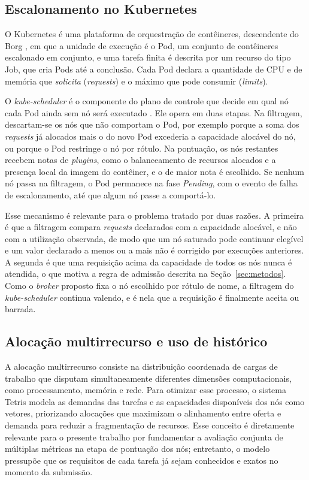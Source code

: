 \documentclass[11pt,a4paper]{article}
\begin{document}
\subsection{Escalonamento no Kubernetes}

O Kubernetes é uma plataforma de orquestração de contêineres, descendente do
Borg \cite{verma2015borg}, em que a unidade de execução é o Pod, um conjunto de
contêineres escalonado em conjunto, e uma tarefa finita é descrita por um
recurso do tipo Job, que cria Pods até a conclusão. Cada Pod declara a
quantidade de CPU e de memória que \textit{solicita} (\textit{requests}) e o
máximo que pode consumir (\textit{limits}).

O \textit{kube-scheduler} é o componente do plano de controle que decide em
qual nó cada Pod ainda sem nó será executado \cite{k8s2026scheduler}. Ele
opera em duas etapas. Na filtragem, descartam-se os nós que não comportam o
Pod, por exemplo porque a soma dos \textit{requests} já alocados mais o do novo
Pod excederia a capacidade alocável do nó, ou porque o Pod restringe o nó por
rótulo. Na pontuação, os nós restantes recebem notas de \textit{plugins}, como
o balanceamento de recursos alocados e a presença local da imagem do
contêiner, e o de maior nota é escolhido. Se nenhum nó passa na filtragem, o
Pod permanece na fase \textit{Pending}, com o evento de falha de
escalonamento, até que algum nó passe a comportá-lo.

Esse mecanismo é relevante para o problema tratado por duas razões. A
primeira é que a filtragem compara \textit{requests} declarados com a
capacidade alocável, e não com a utilização observada, de modo que um nó
saturado pode continuar elegível e um valor declarado a menos ou a mais não é
corrigido por execuções anteriores. A segunda é que uma requisição acima da
capacidade de todos os nós nunca é atendida, o que motiva a regra de admissão
descrita na Seção~\ref{sec:metodos}. Como o \textit{broker} proposto fixa o
nó escolhido por rótulo de nome, a filtragem do \textit{kube-scheduler}
continua valendo, e é nela que a requisição é finalmente aceita ou barrada.

\subsection{Alocação multirrecurso e uso de histórico}

A alocação multirrecurso consiste na distribuição coordenada de cargas de
trabalho que disputam simultaneamente diferentes dimensões computacionais,
como processamento, memória e rede. Para otimizar esse processo, o sistema
Tetris \cite{grandl2014tetris} modela as demandas das tarefas e as
capacidades disponíveis dos nós como vetores, priorizando alocações que
maximizam o alinhamento entre oferta e demanda para reduzir a fragmentação de
recursos. Esse conceito é diretamente relevante para o presente trabalho por
fundamentar a avaliação conjunta de múltiplas métricas na etapa de pontuação
dos nós; entretanto, o modelo pressupõe que os requisitos de cada tarefa já
sejam conhecidos e exatos no momento da submissão.
\end{document}
